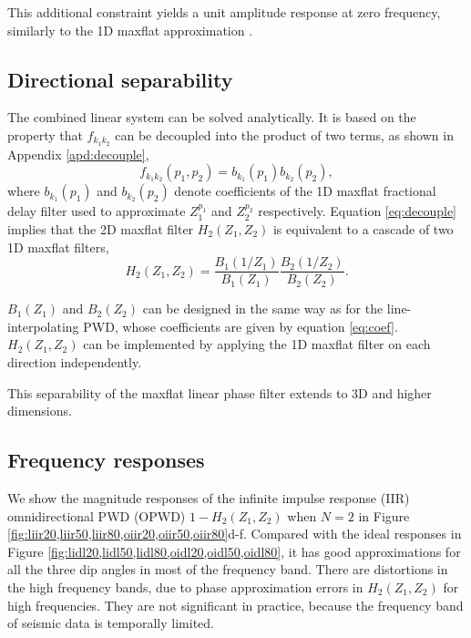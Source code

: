This additional constraint yields a
unit amplitude response at zero frequency,
similarly to the 1D maxflat approximation \cite[]{chen:2012a}.


\subsection{Directional separability}

The combined linear system can be solved analytically.  It
is based on the property that $f_{k_1k_2}$ can be
decoupled into the product of two terms, 
as shown in Appendix \ref{apd:decouple},
\begin{equation}\label{eq:decouple}
f_{k_1k_2}(p_1,p_2)=b_{k_1}(p_1)b_{k_2}(p_2),
\end{equation}
where $b_{k_1}(p_1)$ and $b_{k_2}(p_2)$ denote 
coefficients of the 1D maxflat fractional delay filter used 
to approximate $Z_1^{p_1}$ and $Z_2^{p_2}$ respectively.
Equation \ref{eq:decouple} implies 
that the 2D maxflat filter $H_2(Z_1,Z_2)$ is equivalent 
to a cascade of two 1D maxflat filters,
\begin{equation}
H_2(Z_1,Z_2)=
\frac{B_1(1/Z_1)}{B_1(Z_1)}
\frac{B_2(1/Z_2)}{B_2(Z_2)}.
\end{equation}

$B_1(Z_1)$ and $B_2(Z_2)$ can be designed
in the same way as for the line-interpolating PWD,
whose coefficients are given by
equation \ref{eq:coef}.
$H_2(Z_1,Z_2)$ can be implemented by applying the 1D maxflat filter 
on each direction independently.

This separability of the maxflat linear phase filter extends to
3D and higher dimensions.

\subsection{Frequency responses}


We show the magnitude responses of the 
infinite impulse response (IIR)
omnidirectional PWD (OPWD)
$1-H_2(Z_1,Z_2)$ when $N=2$ in 
Figure \ref{fig:liir20,liir50,liir80,oiir20,oiir50,oiir80}d-f.
Compared with the ideal responses in 
Figure \ref{fig:lidl20,lidl50,lidl80,oidl20,oidl50,oidl80},
it has good approximations for all the three dip angles 
in most of the frequency band.
There are distortions in the high frequency bands,
due to 
phase approximation errors in $H_2(Z_1,Z_2)$ for high frequencies.
They are not significant in practice, 
because the frequency band of seismic data is temporally limited.

